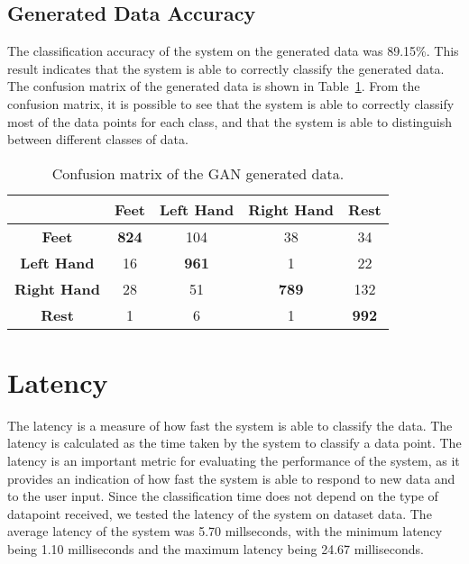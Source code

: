 \subsection*{Generated Data Accuracy}
The classification accuracy of the system on the generated data was 89.15\%.
This result indicates that the system is able to correctly classify the generated data.
The confusion matrix of the generated data is shown in Table~\ref{tab:gan_confusion_matrix}.
From the confusion matrix, it is possible to see that the system is able to correctly classify most of the data points for each class, and that the system is able to distinguish between different classes of data.
\begin{table}[!htbp]
    \centering
    \begin{tabular}{|c||c|c|c|c|}
        \hline
        & \textbf{Feet} & \textbf{Left Hand} & \textbf{Right Hand} & \textbf{Rest} \\
        \hline
        \hline
        \textbf{Feet} & \textbf{824} & 104 & 38 & 34 \\
        \hline
        \textbf{Left Hand} & 16 & \textbf{961} & 1 & 22 \\
        \hline
        \textbf{Right Hand} & 28 & 51 & \textbf{789} & 132 \\
        \hline
        \textbf{Rest} & 1 & 6 & 1 & \textbf{992} \\
        \hline
    \end{tabular}
    \caption{Confusion matrix of the GAN generated data.}\label{tab:gan_confusion_matrix}
\end{table}


\section{Latency}
The latency is a measure of how fast the system is able to classify the data.
The latency is calculated as the time taken by the system to classify a data point.
The latency is an important metric for evaluating the performance of the system, as it provides an indication of how fast the system is able to respond to new data and to the user input.
Since the classification time does not depend on the type of datapoint received, we tested the latency of the system on dataset data.
The average latency of the system was 5.70 millseconds, with the minimum latency being 1.10 milliseconds and the maximum latency being 24.67 milliseconds.

